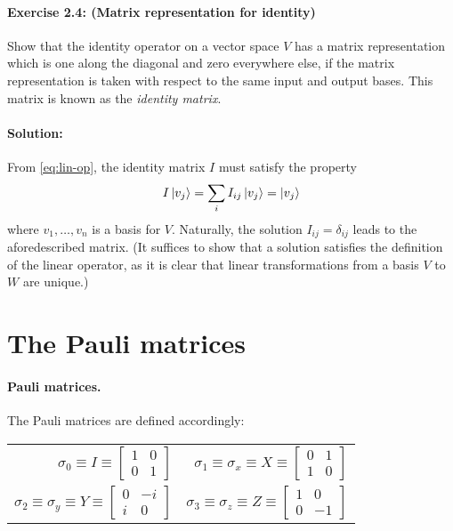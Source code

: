 \paragraph{\cite{mikeandike} Exercise 2.4: (Matrix representation for
identity)} Show that the identity operator on a vector space $V$ has a matrix
representation which is one along the diagonal and zero everywhere else, if the
matrix representation is taken with respect to the same input and output bases.
This matrix is known as the \emph{identity matrix}.

\paragraph{Solution:} From \eqref{eq:lin-op}, the identity matrix $I$ must
satisfy the property \begin{equation*}
  I\ket{v_j} = \sum_i I_{ij}\ket{v_j} = \ket{v_j}
\end{equation*} where $v_1, \ldots, v_n$ is a basis for $V$. Naturally, the
solution $I_{ij} = \delta_{ij}$ leads to the aforedescribed matrix. (It
suffices to show that a solution satisfies the definition of the linear
operator, as it is clear that linear transformations from a basis $V$ to $W$
are unique.)

\section{The Pauli matrices}

\paragraph{Pauli matrices.} The Pauli matrices are defined accordingly:

\begin{center}
  \begin{tabular}{r r}
    \addlinespace[1em]
    $\sigma_0 \equiv I \equiv \begin{bmatrix}
      1 & 0 \\
      0 & 1
    \end{bmatrix}$ & $\sigma_1 \equiv \sigma_x \equiv X \equiv \begin{bmatrix}
      0 & 1 \\
      1 & 0
    \end{bmatrix}$ \\
    \addlinespace[1em]
    $\sigma_2 \equiv \sigma_y \equiv Y \equiv \begin{bmatrix}
      0 & -i \\
      i & 0
    \end{bmatrix}$ & $\sigma_3 \equiv \sigma_z \equiv Z \equiv \begin{bmatrix}
      1 & 0 \\
      0 & -1
    \end{bmatrix}$
  \end{tabular}
\end{center}

